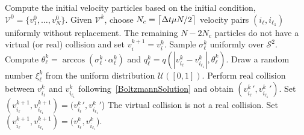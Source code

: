 \documentclass[12pt,nopreprintline]{elsarticle}
\DeclarePairedDelimiter{\ceil}{\lceil}{\rceil}
\newcommand{\cS}{\mathcal S} \newcommand{\cT}{\mathcal T}
\newcommand{\Stwo}{{\cS^2}}
\begin{document}
\begin{algorithm}
  \caption{DSMC Algorithm Using Rejection Sampling\label{alg:VHS_DSMC}}
\begin{algorithmic}[1]
\State  Compute the initial velocity particles based on the initial condition, $\mathcal V^0 = \{v^0_1,\dots,v^0_N\}$. 
\State Given $\mathcal V^{k}$, choose $N_c=\ceil[\big]{ \Delta t \mu N/2}$  velocity pairs $(i_\ell ,i_{\ell_1})$ uniformly without replacement. The remaining $N-2N_c$ particles do not have a virtual (or real) collision and set $v^{k+1}_{i} = v^{k}_{i}$.
\State Sample $\sigma^k_\ell$ uniformly over $\Stwo$.
\State Compute $\theta^k_\ell = \arccos ( \sigma^k_\ell \cdot  \alpha^k_\ell )$ and $q^k_\ell=q( |v^k_{i_{\ell }}-v^k_{i_{\ell_1}}|, \theta^k_\ell)$.
\State Draw a random number $\xi^k_\ell$ from the uniform distribution $\mathcal{U}([0,1])$.
\State Perform real collision between $ v^k_{i_{\ell }}$ and $v^k_{i_{\ell_1}} $ following~\eqref{BoltzmannSolution} and obtain $({v^k_{i_{\ell }}}', {v^k_{i_{\ell_1}}}')$.
\State Set $( v^{k+1}_{i_{\ell }} , v^{k+1}_{i_{\ell_1 }} ) = ({v^k_{i_{\ell }}}', {v^k_{i_{\ell_1}}}'$)
\Else 
\State The virtual collision is not a real collision. Set $( v^{k+1}_{i_{\ell }} , v^{k+1}_{i_{\ell_1}} ) = ({v^k_{i_{\ell }}}, {v^k_{i_{\ell_1}}}$).
\EndIf
\EndFor
\EndFor
\end{algorithmic}
\end{algorithm}
\end{document}
